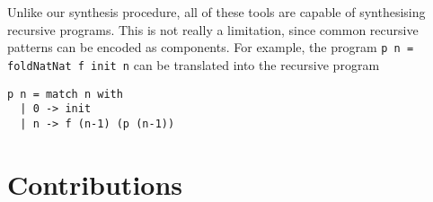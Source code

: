 Unlike our synthesis procedure, all of these tools are capable of synthesising recursive programs. This is not really a limitation, since common recursive patterns can be encoded as components. For example, the program \lstinline!p n = foldNatNat f init n! can be translated into the recursive program
\begin{lstlisting}[style=plain]
p n = match n with
  | 0 -> init
  | n -> f (n-1) (p (n-1))
\end{lstlisting}  
  
  
\section{Contributions}
